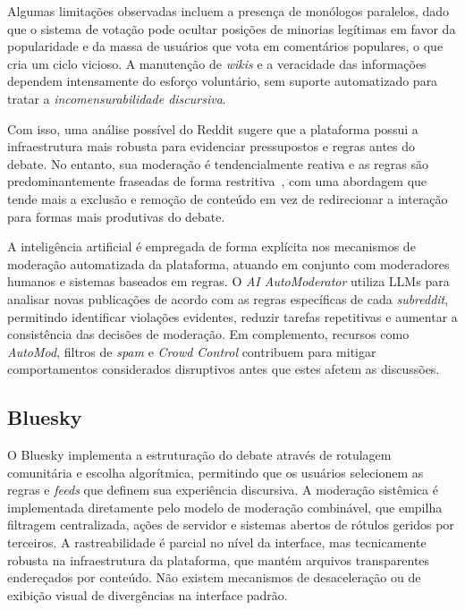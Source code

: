 \documentclass[conference]{IEEEtran} \IEEEoverridecommandlockouts %
\begin{document}
Algumas limitações observadas incluem a presença de monólogos paralelos, dado que o sistema de votação pode ocultar posições de minorias legítimas em favor da popularidade e da massa de usuários que vota em comentários populares, o que cria um ciclo vicioso. A manutenção de \textit{wikis} e a veracidade das informações dependem intensamente do esforço voluntário, sem suporte automatizado para tratar a \textit{incomensurabilidade discursiva}.

Com isso, uma análise possível do Reddit sugere que a plataforma possui a infraestrutura mais robusta para evidenciar pressupostos e regras antes do debate. No entanto, sua moderação é tendencialmente reativa e as regras são predominantemente fraseadas de forma restritiva~\cite{leibmannRedditRulesRulers2025}, com uma abordagem que tende mais a exclusão e remoção de conteúdo em vez de redirecionar a interação para formas mais produtivas do debate.

A inteligência artificial é empregada de forma explícita nos mecanismos de moderação automatizada da plataforma, atuando em conjunto com moderadores humanos e sistemas baseados em regras. O \textit{AI AutoModerator} utiliza LLMs  para analisar novas publicações de acordo com as regras específicas de cada \textit{subreddit}, permitindo identificar violações evidentes, reduzir tarefas repetitivas e aumentar a consistência das decisões de moderação. Em complemento, recursos como \textit{AutoMod}, filtros de \textit{spam} e \textit{Crowd Control} contribuem para mitigar comportamentos considerados disruptivos antes que estes afetem as discussões. 


\subsection{Bluesky}

O Bluesky implementa a estruturação do debate através de rotulagem comunitária e escolha algorítmica, permitindo que os usuários selecionem as regras e \textit{feeds} que definem sua experiência discursiva. A moderação sistêmica é implementada diretamente pelo modelo de moderação combinável, que empilha filtragem centralizada, ações de servidor e sistemas abertos de rótulos geridos por terceiros. A rastreabilidade é parcial no nível da interface, mas tecnicamente robusta na infraestrutura da plataforma, que mantém arquivos transparentes endereçados por conteúdo. Não existem mecanismos de desaceleração ou de exibição visual de divergências na interface padrão.
\end{document}
